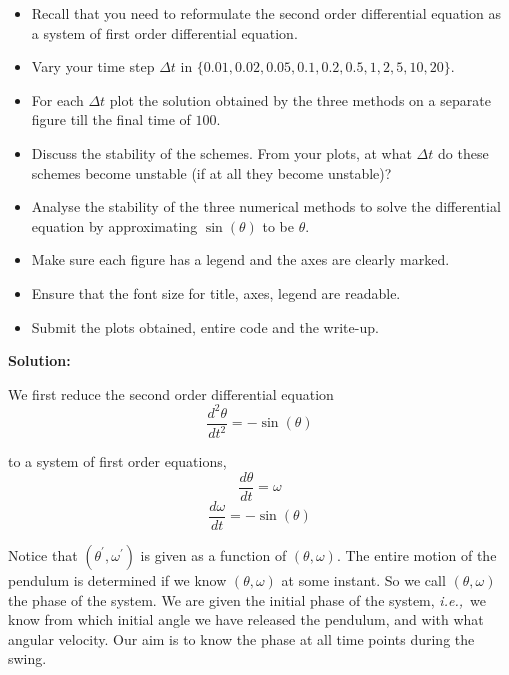 \documentclass[a4paper,11pt]{report}
\begin{document}
\begin{enumerate}
    \begin{itemize}
    \item Recall that you need to reformulate the second order differential 
    equation as a system of first order differential equation.
    \item Vary your time step $\Delta t$ in $\{0.01, 0.02, 0.05, 0.1, 0.2, 
    0.5, 1, 2, 5, 10, 20\}$.
    \item For each $\Delta t$ plot the solution obtained by the three methods 
    on a separate figure till the final time of $100$.
    \item Discuss the stability of the schemes. From your plots, at what 
    $\Delta t$ do these schemes become unstable (if at all they become 
    unstable)?
    \item Analyse the stability of the three numerical methods to solve the 
    differential equation by approximating $\sin(\theta)$ to be $\theta$.
    \item Make sure each figure has a legend and the axes are clearly marked.
    \item Ensure that the font size for title, axes, legend are readable.
    \item Submit the plots obtained, entire code and the write-up.
    \end{itemize}

    \textbf{Solution:}

    We first reduce the second order differential equation
    \begin{equation*}
    \frac{d^{2} \theta}{dt^{2}} = - \sin(\theta)
    \end{equation*}

    to a system of first order equations,
    \begin{equation*}
    \frac{d \theta}{dt} = \omega
    \end{equation*}
    \begin{equation*}
    \frac{d \omega}{dt} = -\sin(\theta)
    \end{equation*}

    Notice that $(\theta^\prime, \omega^\prime)$ is given as a function of 
    $(\theta, \omega)$. The entire motion of the pendulum is determined if we 
    know $(\theta, \omega)$ at some instant. So we call $(\theta, \omega)$ the
    phase of the system. We are given the initial phase of the system, 
    \textit{i.e.,}\ we know from which initial angle we have released the 
    pendulum, and with what angular velocity. Our aim is to know the phase at 
    all time points during the swing.


\end{enumerate}
\end{document}
